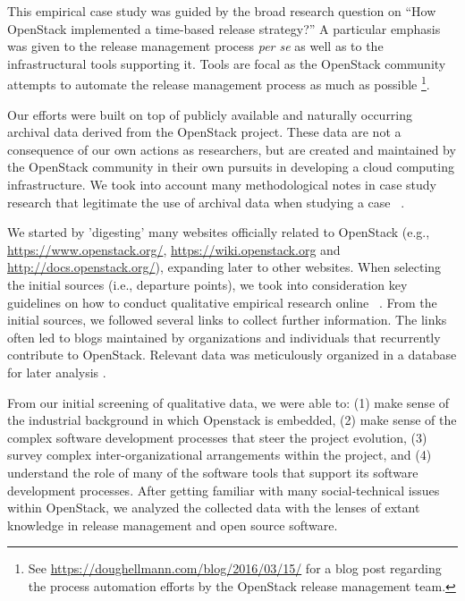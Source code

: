 \documentclass[dvipsnames]{bmcart}
\theoremstyle{definition}
\begin{document}
This empirical case study was guided by the broad research question on ``How OpenStack implemented a time-based release strategy?'' A particular emphasis was given to the release management process \textit{per se} as well as to the infrastructural tools supporting it. Tools are focal as the OpenStack community attempts to automate the release management process as much as possible \footnote{See \url{https://doughellmann.com/blog/2016/03/15/} for a blog post regarding the process automation efforts by the OpenStack release management team.}. 


Our efforts were built on top of publicly available and naturally occurring archival data derived from the OpenStack project.  
These data are not a consequence of our own actions as researchers, but are created and maintained by the OpenStack community in their own pursuits in developing a cloud computing infrastructure. We took into account many methodological notes in case study research that legitimate the use of archival data when studying a case ~\cite{runeson2008guidelines,Easterbrook2008,yin2011,eisenhardt1989building,flynn1990empirical}. 

We started by 'digesting' many websites officially related to OpenStack (e.g., \url{https://www.openstack.org/}, \url{https://wiki.openstack.org} and \url{http://docs.openstack.org/}), expanding later to other websites. When selecting the initial sources (i.e., departure points), we took into consideration key guidelines on how to conduct qualitative empirical research online ~\cite{kozinets_field_2002,kozinets_netnography:_2009}. From the initial sources, we followed several links to collect further information. The links often led to blogs maintained by organizations and individuals that recurrently contribute to OpenStack. Relevant data was meticulously organized in a database for later analysis \cite[pp 94-98]{yin1994case}. 

From our initial screening of qualitative data, we were able to: (1) make sense of the industrial background in which Openstack is embedded, (2) make sense of the complex software development processes that steer the project evolution, (3) survey complex inter-organizational arrangements within the project,  and (4) understand the role of many of the software tools that support its software development processes. After getting familiar with many social-technical issues within OpenStack, we analyzed the collected data with the lenses of extant knowledge in release management and open source software. 
\end{document}

